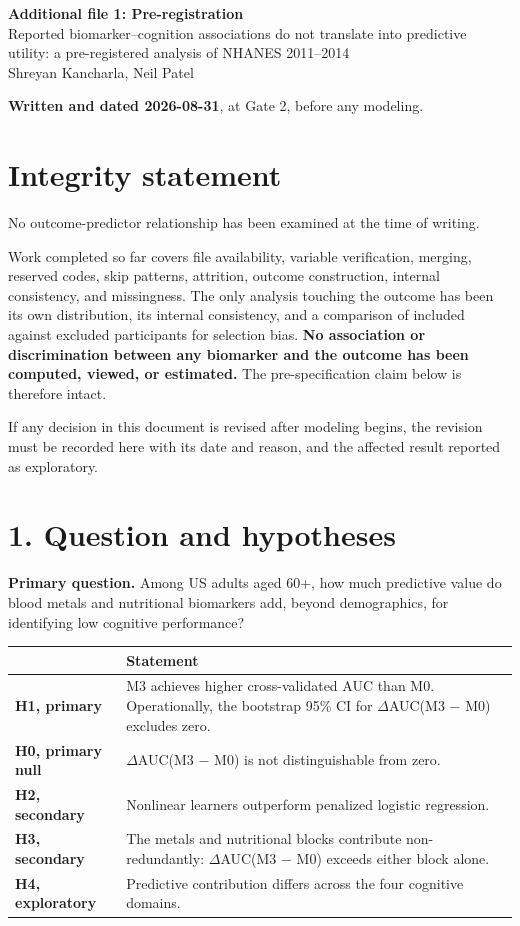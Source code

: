 \documentclass[11pt]{article}
\title{}
\date{}
\begin{document}
\begin{center}
{\large\bfseries Additional file 1: Pre-registration}\\[2pt]
{\small Reported biomarker--cognition associations do not translate into predictive utility: a pre-registered analysis of NHANES 2011--2014}\\[2pt]
{\small Shreyan Kancharla, Neil Patel}
\end{center}

\bigskip

\textbf{Written and dated 2026-08-31}, at Gate 2, before any modeling.

\section*{Integrity statement}

No outcome-predictor relationship has been examined at the time of writing.

Work completed so far covers file availability, variable verification, merging, reserved codes, skip patterns, attrition, outcome construction, internal consistency, and missingness. The only analysis touching the outcome has been its own distribution, its internal consistency, and a comparison of included against excluded participants for selection bias. \textbf{No association or discrimination between any biomarker and the outcome has been computed, viewed, or estimated.} The pre-specification claim below is therefore intact.

If any decision in this document is revised after modeling begins, the revision must be recorded here with its date and reason, and the affected result reported as exploratory.

\section*{1. Question and hypotheses}

\textbf{Primary question.} Among US adults aged 60+, how much predictive value do blood metals and nutritional biomarkers add, beyond demographics, for identifying low cognitive performance?

\begin{longtable}{L{3.2cm}L{11cm}}
\toprule
& Statement \\
\midrule
\endhead
\textbf{H1, primary} & M3 achieves higher cross-validated AUC than M0. Operationally, the bootstrap 95\% CI for $\Delta$AUC(M3 $-$ M0) excludes zero. \\
\textbf{H0, primary null} & $\Delta$AUC(M3 $-$ M0) is not distinguishable from zero. \\
\textbf{H2, secondary} & Nonlinear learners outperform penalized logistic regression. \\
\textbf{H3, secondary} & The metals and nutritional blocks contribute non-redundantly: $\Delta$AUC(M3 $-$ M0) exceeds either block alone. \\
\textbf{H4, exploratory} & Predictive contribution differs across the four cognitive domains. \\
\bottomrule
\end{longtable}
\end{document}
